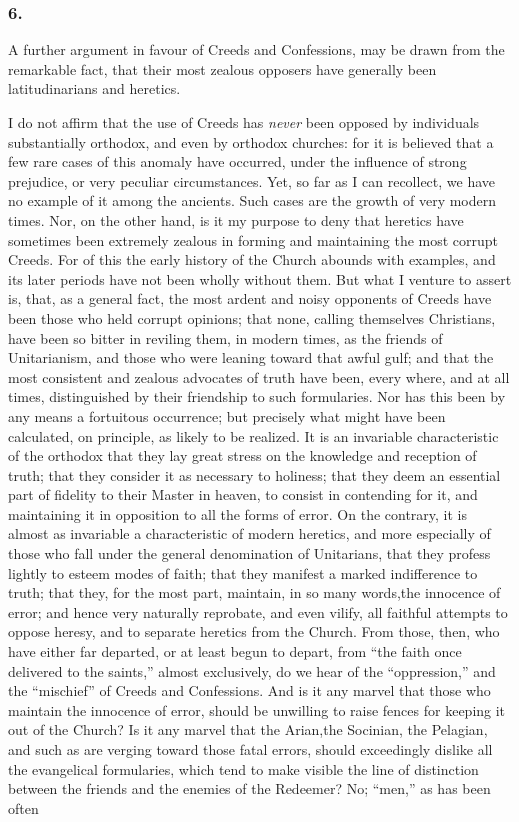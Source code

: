 \documentclass[
]{book}
\begin{document}
\hypertarget{section-5}{%
\subsubsection*{6.}\label{section-5}}

A further argument in favour of Creeds and Confessions, may be drawn from the remarkable fact, that their most zealous opposers have generally been latitudinarians and heretics.

I do not affirm that the use of Creeds has \emph{never} been opposed by individuals substantially orthodox, and even by orthodox churches: for it is believed that a few rare cases of this anomaly have occurred, under the influence of strong prejudice, or very peculiar circumstances. Yet, so far as I can recollect, we have no example of it among the ancients. Such cases are the growth of very modern times. Nor, on the other hand, is it my purpose to deny that heretics have sometimes been extremely zealous in forming and maintaining the most corrupt Creeds. For of this the early history of the Church abounds with examples, and its later periods have not been wholly without them. But what I venture to assert is, that, as a general fact, the most ardent and noisy opponents of Creeds have been those who held corrupt opinions; that none, calling themselves Christians, have been so bitter in reviling them, in modern times, as the friends of Unitarianism, and those who were leaning toward that awful gulf; and that the most consistent and zealous advocates of truth have been, every where, and at all times, distinguished by their friendship to such formularies. Nor has this been by any means a fortuitous occurrence; but precisely what might have been calculated, on principle, as likely to be realized. It is an invariable characteristic of the orthodox that they lay great stress on the knowledge and reception of truth; that they consider it as necessary to holiness; that they deem an essential part of fidelity to their Master in heaven, to consist in contending for it, and maintaining it in opposition to all the forms of error. On the contrary, it is almost as invariable a characteristic of modern heretics, and more especially of those who fall under the general denomination of Unitarians, that they profess lightly to esteem modes of faith; that they manifest a marked indifference to truth; that they, for the most part, maintain, in so many words,the innocence of error; and hence very naturally reprobate, and even vilify, all faithful attempts to oppose heresy, and to separate heretics from the Church. From those, then, who have either far departed, or at least begun to depart, from ``the faith once delivered to the saints,'' almost exclusively, do we hear of the ``oppression,'' and the ``mischief'' of Creeds and Confessions. And is it any marvel that those who maintain the innocence of error, should be unwilling to raise fences for keeping it out of the Church? Is it any marvel that the Arian,the Socinian, the Pelagian, and such as are verging toward those fatal errors, should exceedingly dislike all the evangelical formularies, which tend to make visible the line of distinction between the friends and the enemies of the Redeemer? No; ``men,'' as has been often 
\end{document}
